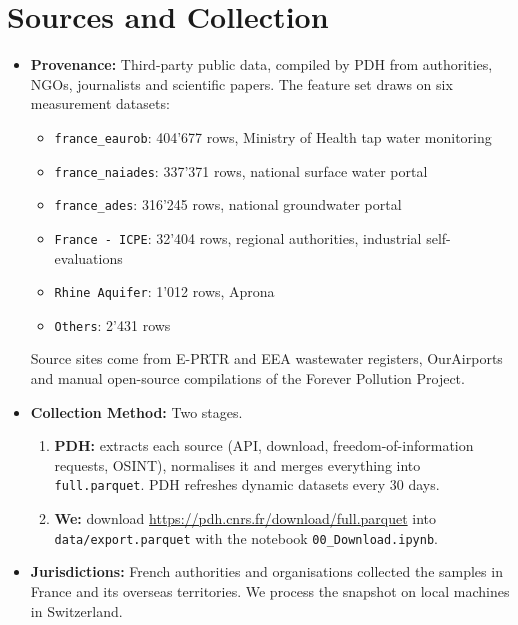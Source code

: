 \documentclass[11pt, a4paper]{article}
\newcommand{\code}[1]{\texttt{#1}}
\begin{document}
\section{Sources and Collection}
\begin{itemize}
    \item \textbf{Provenance:} Third-party public data, compiled by PDH from authorities, NGOs, journalists and scientific papers. The feature set draws on six measurement datasets:
    \begin{itemize}
        \item \code{france\_eaurob}: 404'677 rows, Ministry of Health tap water monitoring
        \item \code{france\_naiades}: 337'371 rows, national surface water portal
        \item \code{france\_ades}: 316'245 rows, national groundwater portal
        \item \code{France - ICPE}: 32'404 rows, regional authorities, industrial self-evaluations
        \item \code{Rhine Aquifer}: 1'012 rows, Aprona
        \item \code{Others}: 2'431 rows
    \end{itemize}
    Source sites come from E-PRTR and EEA wastewater registers, OurAirports and manual open-source compilations of the Forever Pollution Project.
    \item \textbf{Collection Method:} Two stages.
    \begin{enumerate}
        \item \textbf{PDH:} extracts each source (API, download, freedom-of-information requests, OSINT), normalises it and merges everything into \code{full.parquet}. PDH refreshes dynamic datasets every 30 days.
        \item \textbf{We:} download \url{https://pdh.cnrs.fr/download/full.parquet} into \code{data/export.parquet} with the notebook \code{00\_Download.ipynb}.
    \end{enumerate}
    \item \textbf{Jurisdictions:} French authorities and organisations collected the samples in France and its overseas territories. We process the snapshot on local machines in Switzerland.
\end{itemize}

\end{document}
